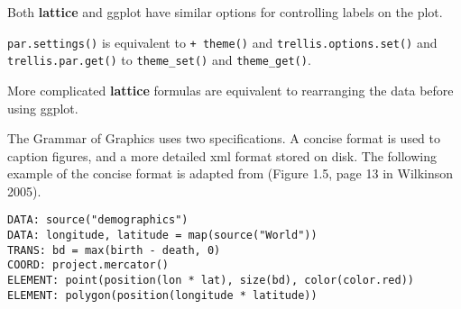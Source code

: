 Both \textbf{lattice} and ggplot have similar options for controlling
labels on the plot.

\begin{Shaded}
\begin{Highlighting}[]
\StringTok{ }
   \NormalTok{, } \NormalTok{, }
   \NormalTok{)}
 
   \NormalTok{, } \NormalTok{, }
   \NormalTok{)}

\StringTok{ } \NormalTok{) }
  \NormalTok{)}
\end{Highlighting}
\end{Shaded}

\texttt{par.settings()} is equivalent to \texttt{+ theme()} and
\texttt{trellis.options.set()} and \texttt{trellis.par.get()} to
\texttt{theme\_set()} and \texttt{theme\_get()}.

More complicated \textbf{lattice} formulas are equivalent to rearranging
the data before using ggplot.


The Grammar of Graphics uses two specifications. A concise format is
used to caption figures, and a more detailed xml format stored on disk.
The following example of the concise format is adapted from (Figure 1.5,
page 13 in Wilkinson 2005). 

\begin{verbatim}
DATA: source("demographics")
DATA: longitude, latitude = map(source("World"))
TRANS: bd = max(birth - death, 0)
COORD: project.mercator()
ELEMENT: point(position(lon * lat), size(bd), color(color.red))
ELEMENT: polygon(position(longitude * latitude))
\end{verbatim}

